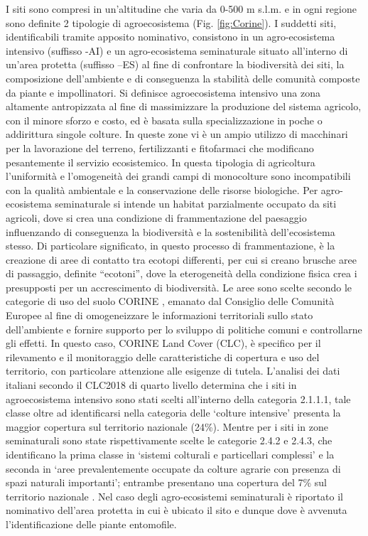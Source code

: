 \documentclass[main.tex]{subfiles}
\begin{document}
I siti sono compresi in un’altitudine che varia da 0-500 m s.l.m. e in ogni regione sono definite 2 tipologie di agroecosistema (Fig. \ref{fig:Corine}). I suddetti siti, identificabili tramite apposito nominativo, consistono in un agro-ecosistema intensivo (suffisso -AI) e un agro-ecosistema seminaturale situato all’interno di un’area protetta (suffisso –ES) al fine di confrontare la biodiversità dei siti, la composizione dell'ambiente e di conseguenza la stabilità delle comunità composte da piante e impollinatori.
Si definisce agroecosistema intensivo una zona altamente antropizzata al fine di massimizzare la produzione del sistema agricolo, con il minore sforzo e costo, ed è basata sulla specializzazione in poche o addirittura singole colture. In queste zone vi è un ampio utilizzo di macchinari per la lavorazione del terreno, fertilizzanti e fitofarmaci che modificano pesantemente il servizio ecosistemico. In questa tipologia di agricoltura l’uniformità e l’omogeneità dei grandi campi di monocolture sono incompatibili con la qualità ambientale e la conservazione delle risorse biologiche.
Per agro-ecosistema seminaturale si intende un habitat parzialmente occupato da siti agricoli, dove si crea una condizione di frammentazione del paesaggio influenzando di conseguenza la biodiversità e la sostenibilità dell’ecosistema stesso. Di particolare significato, in questo processo di frammentazione, è la creazione di aree di contatto tra ecotopi differenti, per cui si creano brusche aree di passaggio, definite “ecotoni”, dove la eterogeneità della condizione fisica crea i presupposti per un accrescimento di biodiversità.
Le aree sono scelte secondo le categorie di uso del suolo CORINE \citep{corine}, emanato dal Consiglio delle Comunità Europee al fine di omogeneizzare le informazioni territoriali sullo stato dell'ambiente e fornire supporto per lo sviluppo di politiche comuni e controllarne gli effetti. In questo caso, CORINE Land Cover (CLC), è specifico per il rilevamento e il monitoraggio delle caratteristiche di copertura e uso del territorio, con particolare attenzione alle esigenze di tutela.
L’analisi dei dati italiani secondo il CLC2018 di quarto livello determina che i siti in agroecosistema intensivo sono stati scelti all’interno della categoria 2.1.1.1, tale classe oltre ad identificarsi nella categoria delle ‘colture intensive’ presenta la maggior copertura sul territorio nazionale (24\%). Mentre per i siti in zone seminaturali sono state rispettivamente scelte le categorie 2.4.2 e 2.4.3, che identificano la prima classe in ‘sistemi colturali e particellari complessi’ e la seconda in ‘aree prevalentemente occupate da colture agrarie con presenza di spazi naturali importanti’; entrambe presentano una copertura del 7\% sul territorio nazionale \citep{muna}.
Nel caso degli agro-ecosistemi seminaturali è riportato il nominativo dell’area protetta in cui è ubicato il sito e dunque dove è avvenuta l’identificazione delle piante entomofile.
\end{document}
